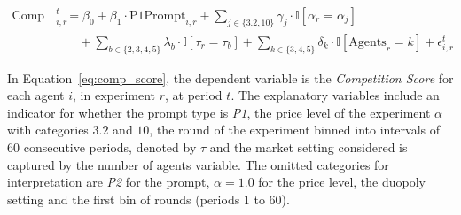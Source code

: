 \begin{equation}\label{eq:comp_score}
\begin{aligned}
    \text{Comp Score}^t_{i,r} &= \beta_0 + \beta_1 \cdot \text{P1Prompt}_{i,r} 
    + \sum_{j \in \{3.2, 10\}} \gamma_j \cdot \mathbb{I}[\alpha_r = \alpha_j] \\
    &\quad + \sum_{b \in \{2, 3, 4, 5\}} \lambda_b \cdot \mathbb{I}[\tau_r = \tau_b] 
    + \sum_{k \in \{3, 4, 5\}} \delta_k \cdot \mathbb{I}[\text{Agents}_r = k] 
    + \epsilon_{i,r}^t
\end{aligned}
\end{equation}

In Equation~\eqref{eq:comp_score}, the dependent variable is the \textit{Competition Score} for each agent $i$, in experiment $r$, at period $t$. The explanatory variables include an indicator for whether the prompt type is \textit{P1}, the price level of the experiment $\alpha$ with categories $3.2$ and $10$, the round of the experiment binned into intervals of 60 consecutive periods, denoted by $\tau$ and the market setting considered is captured by the number of agents variable. The omitted categories for interpretation are \textit{P2} for the prompt, $\alpha = 1.0$ for the price level, the duopoly setting and the first bin of rounds (periods 1 to 60).



